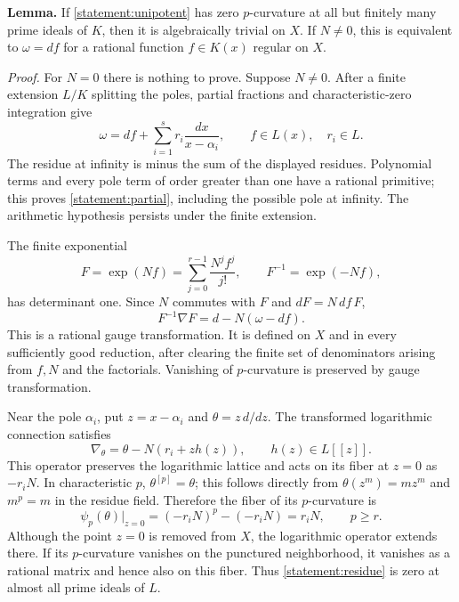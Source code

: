 \documentclass[11pt,a4paper]{article}
\numberwithin{equation}{section}
\begin{document}
\textbf{Lemma.}
If \eqref{statement:unipotent} has zero $p$-curvature at all but finitely many prime
ideals of $K$, then it is algebraically trivial on $X$. If $N\ne0$, this is
equivalent to $\omega=df$ for a rational function $f\in K(x)$ regular on $X$.

\emph{Proof.}
For $N=0$ there is nothing to prove. Suppose $N\ne0$. After a finite extension
$L/K$ splitting the poles, partial fractions and characteristic-zero
integration give
\begin{equation}\label{statement:partial}
 \omega=df+\sum_{i=1}^s r_i\frac{dx}{x-\alpha_i},
 \qquad f\in L(x),\quad r_i\in L.
\end{equation}
The residue at infinity is minus the sum of the displayed residues. Polynomial
terms and every pole term of order greater than one have a rational primitive;
this proves \eqref{statement:partial}, including the possible pole at infinity.
The arithmetic hypothesis persists under the finite extension.

The finite exponential
\begin{equation}\label{statement:gauge}
 F=\exp(Nf)=\sum_{j=0}^{r-1}\frac{N^jf^j}{j!},
 \qquad F^{-1}=\exp(-Nf),
\end{equation}
has determinant one. Since $N$ commutes with $F$ and $dF=N\,df\,F$,
\[
 F^{-1}\nabla F=d-N(\omega-df).
\]
This is a rational gauge transformation. It is defined on $X$ and in every
sufficiently good reduction, after clearing the finite set of denominators
arising from $f,N$ and the factorials. Vanishing of $p$-curvature is
preserved by gauge transformation.

Near the pole $\alpha_i$, put $z=x-\alpha_i$ and
$\theta=z\,d/dz$. The transformed logarithmic connection satisfies
\[
 \nabla_\theta=\theta-N(r_i+zh(z)),\qquad h(z)\in L[\![z]\!].
\]
This operator preserves the logarithmic lattice and acts on its fiber
at $z=0$ as $-r_iN$. In characteristic $p$, $\theta^{[p]}=\theta$;
this follows directly from $\theta(z^m)=mz^m$ and $m^p=m$ in the residue
field. Therefore the fiber of its $p$-curvature is
\begin{equation}\label{statement:residue}
 \psi_p(\theta)\big|_{z=0}=(-r_iN)^p-(-r_iN)=r_iN,
 \qquad p\ge r.
\end{equation}
Although the point $z=0$ is removed from $X$, the logarithmic operator extends
there. If its $p$-curvature vanishes on the punctured neighborhood, it vanishes
as a rational matrix and hence also on this fiber. Thus \eqref{statement:residue}
is zero at almost all prime ideals of $L$.
\end{document}
